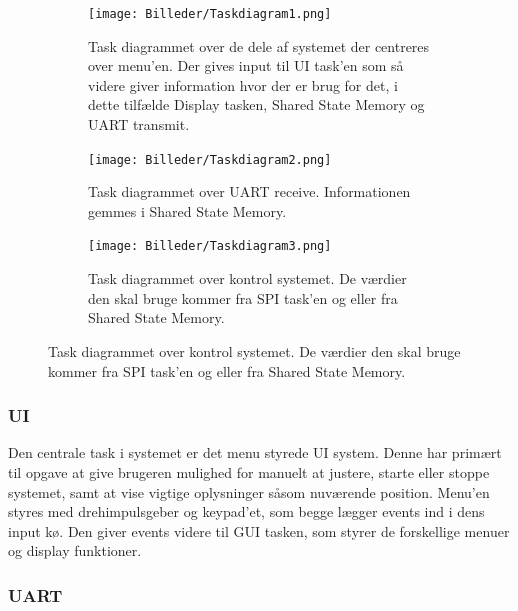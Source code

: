 \begin{figure}[h]
\centering
\begin{subfigure}[b]{0.5\textwidth}
	\texttt{[image: Billeder/Taskdiagram1.png]}
	\caption{Task diagrammet over de dele af systemet der centreres over menu'en. Der gives input til UI task'en som så videre giver information hvor der er brug for det, i dette tilfælde Display tasken, Shared State Memory og UART transmit.}
	\label{fig:task1}
    \end{subfigure}
    \begin{subfigure}[b]{0.5\textwidth}
\texttt{[image: Billeder/Taskdiagram2.png]}
	\caption{Task diagrammet over UART receive. Informationen gemmes i Shared State Memory.}
	\label{fig:task2}
    \end{subfigure}
    \begin{subfigure}[b]{0.5\textwidth}
	\texttt{[image: Billeder/Taskdiagram3.png]}
	\caption{Task diagrammet over kontrol systemet. De værdier den skal bruge kommer fra SPI task'en og eller fra Shared State Memory.}
	\label{fig:task3}
    \end{subfigure}
\label{fig:taskdiagram}
\end{figure}


\subsubsection{UI}

Den centrale task i systemet er det menu styrede UI system. Denne har primært til opgave at give brugeren mulighed for manuelt at justere, starte eller stoppe systemet, samt at vise vigtige oplysninger såsom nuværende position. Menu'en styres med drehimpulsgeber og keypad'et, som begge lægger events ind i dens input kø. Den giver events videre til GUI tasken, som styrer de forskellige menuer og display funktioner.



\subsubsection{UART}

